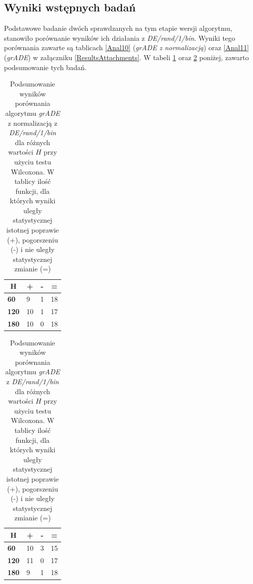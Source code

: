 \documentclass[12pt,a4paper]{report}
\begin{document}
{{{{{{{\subsection{Wyniki wstępnych badań}
\par{
Podstawowe badanie dwóch sprawdzanych na tym etapie wersji algorytmu, stanowiło porównanie wyników ich działania z \emph{DE/rand/1/bin}. Wyniki tego porównania zawarte są tablicach \ref{Anal10} (\emph{grADE z normalizacją}) oraz \ref{Anal11} (\emph{grADE}) w załączniku \ref{ResultsAttachments}. W tabeli \ref{Anal10Sum} oraz \ref{Anal11Sum} poniżej, zawarto podsumowanie tych badań.
}
\begin{table}[h]
\centering
\caption{Podsumowanie wyników porównania algorytmu \emph{grADE} z normalizacją z \emph{DE/rand/1/bin} dla różnych wartości $H$ przy użyciu testu Wilcoxona. W tablicy ilość funkcji, dla których wyniki uległy statystycznej istotnej poprawie (+), pogorszeniu (-) i nie uległy statystycznej zmianie (=)}
\label{Anal10Sum}
\begin{tabular}{|l|l|l|l|}
\hline
\multicolumn{1}{|c|}{{\bf H}} & \multicolumn{1}{c|}{{\bf +}} & \multicolumn{1}{c|}{{\bf -}} & \multicolumn{1}{c|}{{\bf =}} \\ \hline
{\bf 60}  & 9  & 1 & 18 \\ \hline
{\bf 120} & 10 & 1 & 17 \\ \hline
{\bf 180} & 10 & 0 & 18 \\ \hline
\end{tabular}
\end{table}

\begin{table}[h]
\centering
\caption{Podsumowanie wyników porównania algorytmu \emph{grADE} z \emph{DE/rand/1/bin} dla różnych wartości $H$ przy użyciu testu Wilcoxona. W tablicy ilość funkcji, dla których wyniki uległy statystycznej istotnej poprawie (+), pogorszeniu (-) i nie uległy statystycznej zmianie (=)}
\label{Anal11Sum}
\begin{tabular}{|l|l|l|l|}
\hline
\multicolumn{1}{|c|}{{\bf H}} & \multicolumn{1}{c|}{{\bf +}} & \multicolumn{1}{c|}{{\bf -}} & \multicolumn{1}{c|}{{\bf =}} \\ \hline
{\bf 60}  & 10 & 3 & 15 \\ \hline
{\bf 120} & 11 & 0 & 17 \\ \hline
{\bf 180} & 9  & 1 & 18 \\ \hline
\end{tabular}
\end{table}

}}}}}}}
\end{document}

